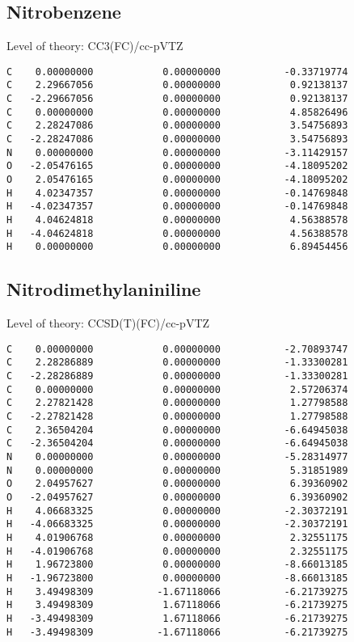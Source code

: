 \documentclass[journal=jctcce,manuscript=article,layout=traditional]{achemso}
\newcommand{\TZ}{cc-pVTZ}
\begin{document}
\subsection*{Nitrobenzene}

\begin{singlespace}
Level of theory: CC3(FC)/{\TZ}
\begin{verbatim}
C    0.00000000            0.00000000           -0.33719774
C    2.29667056            0.00000000            0.92138137
C   -2.29667056            0.00000000            0.92138137
C    0.00000000            0.00000000            4.85826496
C    2.28247086            0.00000000            3.54756893
C   -2.28247086            0.00000000            3.54756893
N    0.00000000            0.00000000           -3.11429157
O   -2.05476165            0.00000000           -4.18095202
O    2.05476165            0.00000000           -4.18095202
H    4.02347357            0.00000000           -0.14769848
H   -4.02347357            0.00000000           -0.14769848
H    4.04624818            0.00000000            4.56388578
H   -4.04624818            0.00000000            4.56388578
H    0.00000000            0.00000000            6.89454456
\end{verbatim}
\end{singlespace}

\subsection*{Nitrodimethylaniniline}

\begin{singlespace}
Level of theory: CCSD(T)(FC)/{\TZ}
\begin{verbatim}
C    0.00000000            0.00000000           -2.70893747
C    2.28286889            0.00000000           -1.33300281
C   -2.28286889            0.00000000           -1.33300281
C    0.00000000            0.00000000            2.57206374
C    2.27821428            0.00000000            1.27798588
C   -2.27821428            0.00000000            1.27798588
C    2.36504204            0.00000000           -6.64945038
C   -2.36504204            0.00000000           -6.64945038
N    0.00000000            0.00000000           -5.28314977
N    0.00000000            0.00000000            5.31851989
O    2.04957627            0.00000000            6.39360902
O   -2.04957627            0.00000000            6.39360902
H    4.06683325            0.00000000           -2.30372191
H   -4.06683325            0.00000000           -2.30372191
H    4.01906768            0.00000000            2.32551175
H   -4.01906768            0.00000000            2.32551175
H    1.96723800            0.00000000           -8.66013185
H   -1.96723800            0.00000000           -8.66013185
H    3.49498309           -1.67118066           -6.21739275
H    3.49498309            1.67118066           -6.21739275
H   -3.49498309            1.67118066           -6.21739275
H   -3.49498309           -1.67118066           -6.21739275
\end{verbatim}
\end{singlespace}
\end{document}
